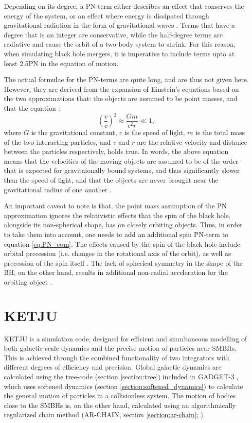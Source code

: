 \documentclass[english, oneside]{HYgradu}
\begin{document}
Depending on its degree, a PN-term either describes an effect that conserves the energy of the system, or an effect where energy is dissipated through gravitational radiation in the form of gravitational waves \citep{Mora2004}. Terms that have a degree that is an integer are conservative, while the half-degree terms are radiative and cause the orbit of a two-body system to shrink. For this reason, when simulating black hole mergers, it is imperative to include terms upto at least 2.5PN in the equation of motion.

The actual formulae for the PN-terms are quite long, and are thus not given here. However, they are derived from the expansion of Einstein's equations based on the two approximations that: the objects are assumed to be point masses, and that the equation \citep{MerrittBook}:
\begin{equation}
\left( \frac{v}{c} \right)^2 \approx \frac{Gm}{c^2r} \ll 1,
\end{equation}
where $G$ is the gravitational constant, $c$ is the speed of light, $m$ is the total mass of the two interacting particles, and $v$ and $r$ are the relative velocity and distance between the particles respectively, holds true. In words, the above equation means that the velocities of the moving objects are assumed to be of the order that is expected for gravitaionally bound systems, and thus significantly slower than the speed of light, and that the objects are never brought near the gravitational radius of one another \citep{MerrittBook}. 

An important caveat to note is that, the point mass assumption of the PN approximation ignores the relativistic effects that the spin of the black hole, alongside its non-spherical shape, has on closely orbiting objects. Thus, in order to take them into account, one needs to add an additional spin PN-term to equation \ref{eq:PN_eom}. The effects caused by the spin of the black hole include orbital precession (i.e. changes in the rotational axis of the orbit), as well as precession of the spin itself \citep{Kidder1995}. The lack of spherical symmetry in the shape of the BH, on the other hand, results in additional non-radial acceleration for the orbiting object \citep{MerrittBook}. 

\chapter{KETJU}

KETJU \citep{Rantala2017KETJU} is a simulation code, designed for efficient and simultaneous modelling of both galactic-scale dynamics and the precise motion of particles near SMBHs. This is achieved through the combined functionality of two integrators with different degrees of efficiency and precision. Global galactic dynamics are calculated using the tree-code (section \ref{section:tree}) included in GADGET-3 \citep{Springel2005}, which uses softened dynamics (section \ref{section:softened_dynamics}) to calculate the general motion of particles in a collisionless system. The motion of bodies close to the SMBHs is, on the other hand, calculated using an algorithmically regularized chain method (AR-CHAIN, section \ref{section:ar-chain}; \citep{Mikkola2008ARCHAIN}).
\end{document}
